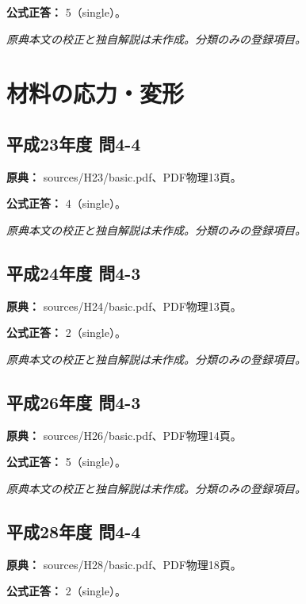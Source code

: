 \textbf{公式正答：} 5（single）。

\par\textit{原典本文の校正と独自解説は未作成。分類のみの登録項目。}

\section{材料の応力・変形}

\subsection{平成23年度 問4-4}
\label{q:h23-reg-basic-4-4}

\noindent\textbf{原典：} sources/H23/basic.pdf、PDF物理13頁。

\textbf{公式正答：} 4（single）。

\par\textit{原典本文の校正と独自解説は未作成。分類のみの登録項目。}

\subsection{平成24年度 問4-3}
\label{q:h24-reg-basic-4-3}

\noindent\textbf{原典：} sources/H24/basic.pdf、PDF物理13頁。

\textbf{公式正答：} 2（single）。

\par\textit{原典本文の校正と独自解説は未作成。分類のみの登録項目。}

\subsection{平成26年度 問4-3}
\label{q:h26-reg-basic-4-3}

\noindent\textbf{原典：} sources/H26/basic.pdf、PDF物理14頁。

\textbf{公式正答：} 5（single）。

\par\textit{原典本文の校正と独自解説は未作成。分類のみの登録項目。}

\subsection{平成28年度 問4-4}
\label{q:h28-reg-basic-4-4}

\noindent\textbf{原典：} sources/H28/basic.pdf、PDF物理18頁。

\textbf{公式正答：} 2（single）。

